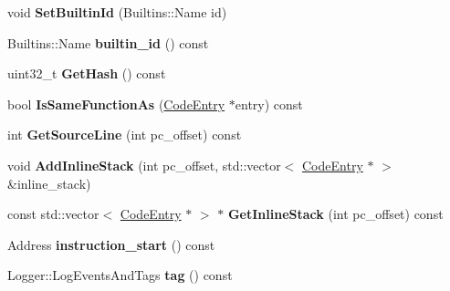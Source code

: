 \begin{DoxyCompactItemize}
\item 
void {\bfseries Set\+Builtin\+Id} (Builtins\+::\+Name id)\hypertarget{classv8_1_1internal_1_1_code_entry_a059bc6a8c10ba7ef846f7c11b592784d}{}\label{classv8_1_1internal_1_1_code_entry_a059bc6a8c10ba7ef846f7c11b592784d}

\item 
Builtins\+::\+Name {\bfseries builtin\+\_\+id} () const \hypertarget{classv8_1_1internal_1_1_code_entry_a5be3a3fbdfd5d1e972f4a1d49a7034b6}{}\label{classv8_1_1internal_1_1_code_entry_a5be3a3fbdfd5d1e972f4a1d49a7034b6}

\item 
uint32\+\_\+t {\bfseries Get\+Hash} () const \hypertarget{classv8_1_1internal_1_1_code_entry_a93994be2c934c40356bc966b157d6782}{}\label{classv8_1_1internal_1_1_code_entry_a93994be2c934c40356bc966b157d6782}

\item 
bool {\bfseries Is\+Same\+Function\+As} (\hyperlink{classv8_1_1internal_1_1_code_entry}{Code\+Entry} $\ast$entry) const \hypertarget{classv8_1_1internal_1_1_code_entry_ac871923c472a61097ee397998898e073}{}\label{classv8_1_1internal_1_1_code_entry_ac871923c472a61097ee397998898e073}

\item 
int {\bfseries Get\+Source\+Line} (int pc\+\_\+offset) const \hypertarget{classv8_1_1internal_1_1_code_entry_a797ef437ed39cdc923112f1b1dbb157a}{}\label{classv8_1_1internal_1_1_code_entry_a797ef437ed39cdc923112f1b1dbb157a}

\item 
void {\bfseries Add\+Inline\+Stack} (int pc\+\_\+offset, std\+::vector$<$ \hyperlink{classv8_1_1internal_1_1_code_entry}{Code\+Entry} $\ast$ $>$ \&inline\+\_\+stack)\hypertarget{classv8_1_1internal_1_1_code_entry_a36c9be7787aa77d2018ede7d7748e301}{}\label{classv8_1_1internal_1_1_code_entry_a36c9be7787aa77d2018ede7d7748e301}

\item 
const std\+::vector$<$ \hyperlink{classv8_1_1internal_1_1_code_entry}{Code\+Entry} $\ast$ $>$ $\ast$ {\bfseries Get\+Inline\+Stack} (int pc\+\_\+offset) const \hypertarget{classv8_1_1internal_1_1_code_entry_a974f607d271d54e796a2b7b2d5790514}{}\label{classv8_1_1internal_1_1_code_entry_a974f607d271d54e796a2b7b2d5790514}

\item 
Address {\bfseries instruction\+\_\+start} () const \hypertarget{classv8_1_1internal_1_1_code_entry_a34a9fd7063b32f459c8ea7a5aeaf2be7}{}\label{classv8_1_1internal_1_1_code_entry_a34a9fd7063b32f459c8ea7a5aeaf2be7}

\item 
Logger\+::\+Log\+Events\+And\+Tags {\bfseries tag} () const \hypertarget{classv8_1_1internal_1_1_code_entry_aa3959a298e1f659d3d4eddb2abf3664c}{}\label{classv8_1_1internal_1_1_code_entry_aa3959a298e1f659d3d4eddb2abf3664c}

\end{DoxyCompactItemize}
